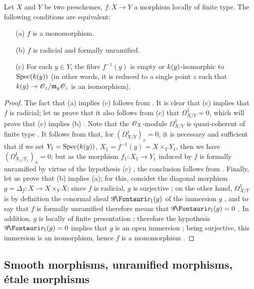 \begin{proposition}[17.2.6]
\label{IV.17.2.6}
Let $X$ and $Y$ be two preschemes, $f:X\to Y$ a morphism locally of finite type. 
The following conditions are equivalent:
\begin{enumerate}
  \item[{\rm(a)}] $f$ is a monomorphism.
  \item[{\rm(b)}] $f$ is radicial and formally unramified.
  \item[{\rm(c)}] For each $y\in Y$, the fibre $f^{-1}(y)$ is empty or $k(y)$-isomorphic to $\operatorname{Spec}(k(y))$ (in other words, it is reduced to a single point $z$ such that $\kres(y)\to\sh{O}_z/\mathfrak{m}_y\sh{O}_z$ is an isomorphism).
\end{enumerate}
\end{proposition}

\begin{proof}
The fact that (a) implies (c) follows from . 
It is clear that (c) implies that $f$ is radicial;
let us prove that it also follows from (c) that $\Omega_{X/Y}^1=0$, which will prove that (c) implies (b) .
Note that the $\mathscr{O}_X$-module $\Omega_{X/Y}^1$ is quasi-coherent of finite type .
It follows from  that, for $(\Omega_{X/Y}^1)_x=0$, it is necessary and sufficient that if we set $Y_1=\operatorname{Spec}(k(y))$, $X_1=f^{-1}(y)=X\times_Y Y_1$, then we have $(\Omega_{X_1/Y_1}^1)_x=0$;
but as the morphism $f_1:X_1\to Y_1$ induced by $f$ is formally unramified by virtue of the hypothesis (c) , the conclusion follows from .
Finally, let us prove that (b) implies (a);
for this, consider the diagonal morphism $g=\Delta_f:X\to X\times_Y X$;
since $f$ is radicial, $g$ is surjective ;
on the other hand, $\Omega_{X/Y}^1$ is by definition the conormal sheaf $\shGr_1(g)$ of the immersion $g$ , and to say that $f$ is formally unramified therefore means that
$\shGr_1(g)=0$ . 
In addition, $g$ is locally of finite presentation ;
therefore the hypothesis $\shGr_1(g)=0$ implies that $g$ is an open immersion ;
being surjective, this immersion is an isomorphism, hence $f$ is a monomorphism .
\end{proof}

\subsection{Smooth morphisms, unramified morphisms, \'etale morphisms}
\label{subsection:IV.17.3}

